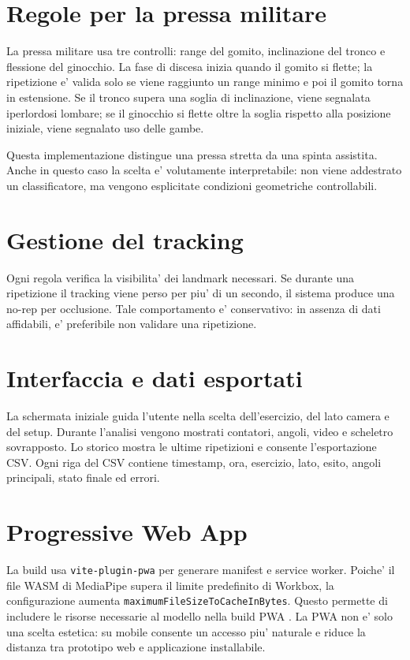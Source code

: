 \section{Regole per la pressa militare}

La pressa militare usa tre controlli: range del gomito, inclinazione del tronco e flessione del ginocchio. La fase di discesa inizia quando il gomito si flette; la ripetizione e' valida solo se viene raggiunto un range minimo e poi il gomito torna in estensione. Se il tronco supera una soglia di inclinazione, viene segnalata iperlordosi lombare; se il ginocchio si flette oltre la soglia rispetto alla posizione iniziale, viene segnalato uso delle gambe.

Questa implementazione distingue una pressa stretta da una spinta assistita. Anche in questo caso la scelta e' volutamente interpretabile: non viene addestrato un classificatore, ma vengono esplicitate condizioni geometriche controllabili.

\section{Gestione del tracking}

Ogni regola verifica la visibilita' dei landmark necessari. Se durante una ripetizione il tracking viene perso per piu' di un secondo, il sistema produce una no-rep per occlusione. Tale comportamento e' conservativo: in assenza di dati affidabili, e' preferibile non validare una ripetizione.

\section{Interfaccia e dati esportati}

La schermata iniziale guida l'utente nella scelta dell'esercizio, del lato camera e del setup. Durante l'analisi vengono mostrati contatori, angoli, video e scheletro sovrapposto. Lo storico mostra le ultime ripetizioni e consente l'esportazione CSV. Ogni riga del CSV contiene timestamp, ora, esercizio, lato, esito, angoli principali, stato finale ed errori.

\section{Progressive Web App}

La build usa \texttt{vite-plugin-pwa} per generare manifest e service worker. Poiche' il file WASM di MediaPipe supera il limite predefinito di Workbox, la configurazione aumenta \texttt{maximumFileSizeToCacheInBytes}. Questo permette di includere le risorse necessarie al modello nella build PWA \cite{vitePwaDocs2026}. La PWA non e' solo una scelta estetica: su mobile consente un accesso piu' naturale e riduce la distanza tra prototipo web e applicazione installabile.
